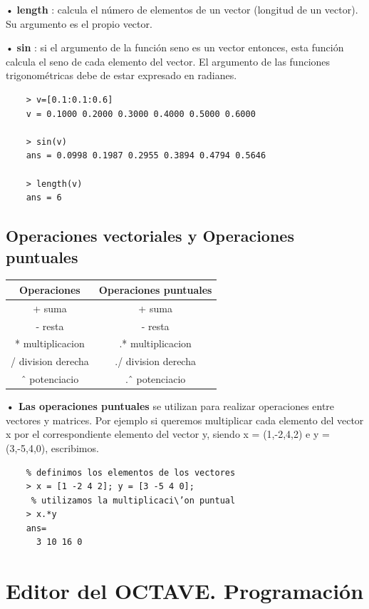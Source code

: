 \documentclass[a4,12pt]{article}
\begin{document}
• \textbf{length} : calcula el número de elementos de un vector (longitud de un vector). Su argumento es el propio vector.

• \textbf{sin} : si el argumento de la función seno es un vector entonces, esta función calcula el seno de cada elemento del vector. El argumento de las funciones trigonométricas debe de estar expresado en radianes.
\begin{verbatim}
    > v=[0.1:0.1:0.6]
    v = 0.1000 0.2000 0.3000 0.4000 0.5000 0.6000

    > sin(v)
    ans = 0.0998 0.1987 0.2955 0.3894 0.4794 0.5646

    > length(v)
    ans = 6
\end{verbatim}

\subsection{Operaciones vectoriales y Operaciones puntuales}

\begin{center}
\begin{tabular}{|c|c|} \hline
\textbf{Operaciones}   &  \textbf{Operaciones puntuales} \\ \hline
+     suma & +     suma \\  \hline
-     resta & -     resta \\ \hline
*     multiplicacion & .*     multiplicacion \\  \hline
/     division derecha & ./     division derecha \\ \hline
ˆ     potenciacio & .ˆ     potenciacio \\ \hline
\end{tabular}
\end{center}

\textbf{• Las operaciones puntuales} se utilizan para realizar operaciones entre vectores y matrices. Por ejemplo si queremos multiplicar cada elemento del vector x por el correspondiente elemento del vector y, siendo x = (1,-2,4,2) e y = (3,-5,4,0), escribimos.
\begin{verbatim}
    % definimos los elementos de los vectores
    > x = [1 -2 4 2]; y = [3 -5 4 0];
     % utilizamos la multiplicaci\’on puntual
    > x.*y
    ans=
      3 10 16 0
\end{verbatim}

\section{Editor del OCTAVE. Programación}
\end{document}
